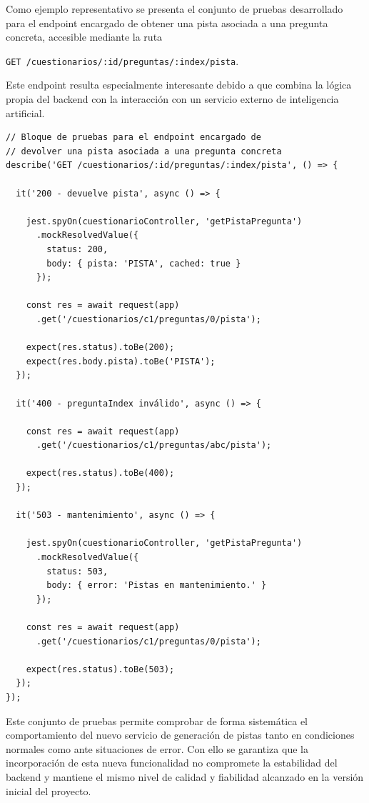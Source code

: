 Como ejemplo representativo se presenta el conjunto de pruebas desarrollado para el endpoint encargado de obtener una pista asociada a una pregunta concreta, accesible mediante la ruta 

\texttt{GET /cuestionarios/:id/preguntas/:index/pista}. 

Este endpoint resulta especialmente interesante debido a que combina la lógica propia del backend con la interacción con un servicio externo de inteligencia artificial.

\begin{Verbatim}[frame=single, fontsize=\small, xleftmargin=10pt, xrightmargin=10pt]
// Bloque de pruebas para el endpoint encargado de
// devolver una pista asociada a una pregunta concreta
describe('GET /cuestionarios/:id/preguntas/:index/pista', () => {

  it('200 - devuelve pista', async () => {

    jest.spyOn(cuestionarioController, 'getPistaPregunta')
      .mockResolvedValue({
        status: 200,
        body: { pista: 'PISTA', cached: true }
      });

    const res = await request(app)
      .get('/cuestionarios/c1/preguntas/0/pista');

    expect(res.status).toBe(200);
    expect(res.body.pista).toBe('PISTA');
  });

  it('400 - preguntaIndex inválido', async () => {

    const res = await request(app)
      .get('/cuestionarios/c1/preguntas/abc/pista');

    expect(res.status).toBe(400);
  });

  it('503 - mantenimiento', async () => {

    jest.spyOn(cuestionarioController, 'getPistaPregunta')
      .mockResolvedValue({
        status: 503,
        body: { error: 'Pistas en mantenimiento.' }
      });

    const res = await request(app)
      .get('/cuestionarios/c1/preguntas/0/pista');

    expect(res.status).toBe(503);
  });
});

\end{Verbatim}

Este conjunto de pruebas permite comprobar de forma sistemática el comportamiento del nuevo servicio de generación de pistas tanto en condiciones normales como ante situaciones de error. Con ello se garantiza que la incorporación de esta nueva funcionalidad no compromete la estabilidad del backend y mantiene el mismo nivel de calidad y fiabilidad alcanzado en la versión inicial del proyecto.

